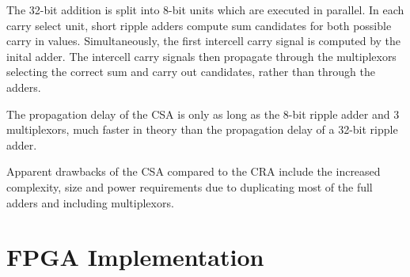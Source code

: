 \documentclass[a4paper,11pt]{article}
\begin{document}
The 32-bit addition is split into 8-bit units which are executed in parallel. In each carry select unit, short ripple adders compute sum candidates for both possible carry in values. Simultaneously, the first intercell carry signal is computed by the inital adder. The intercell carry signals then propagate through the multiplexors selecting the correct sum and carry out candidates, rather than through the adders.

The propagation delay of the CSA is only as long as the 8-bit ripple adder and 3 multiplexors, much faster in theory than the propagation delay of a 32-bit ripple adder.

Apparent drawbacks of the CSA compared to the CRA include the increased complexity, size and power requirements due to duplicating most of the full adders and including multiplexors.

\section{FPGA Implementation}

\printbibliography
\end{document}
